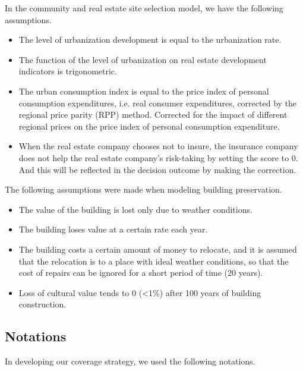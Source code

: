 \documentclass[12pt]{article}  %
\begin{document}
In the community and real estate site selection model, we have the following assumptions.
\begin{itemize}
    \item The level of urbanization development is equal to the urbanization rate.
    \item The function of the level of urbanization on real estate development indicators is trigonometric.
    \item The urban consumption index is equal to the price index of personal consumption expenditures, i.e. real consumer expenditures, corrected by the regional price parity (RPP) method. Corrected for the impact of different regional prices on the price index of personal consumption expenditure.
    \item When the real estate company chooses not to insure, the insurance company does not help the real estate company's risk-taking by setting the score to 0. And this will be reflected in the decision outcome by making the correction.
\end{itemize}

The following assumptions were made when modeling building preservation.
\begin{itemize}
    \item The value of the building is lost only due to weather conditions.
    \item The building loses value at a certain rate each year.
    \item The building costs a certain amount of money to relocate, and it is assumed that the relocation is to a place with ideal weather conditions, so that the cost of repairs can be ignored for a short period of time (20 years).
    \item Loss of cultural value tends to 0 (<1\%) after 100 years of building construction.
\end{itemize}


\subsection{Notations}
In developing our coverage strategy, we used the following notations.
\end{document}
